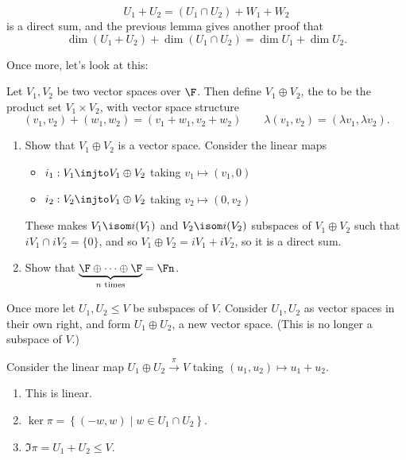 \begin{corollary}
	\begin{equation*}
		U_1 + U_2 = (U_1 \cap U_2) + W_1 + W_2
	\end{equation*}
	is a direct sum, and the previous lemma gives another proof that
	\begin{equation*}
		\dim(U_1 + U_2) + \dim(U_1 \cap U_2) = \dim U_1 + \dim U_2.
	\end{equation*}
\end{corollary}

Once more, let's look at this:

\begin{definition}
	Let $V_1,V_2$ be two vector spaces over $\F$. Then define $V_1\oplus V_2$, the  to be the product set $V_1\times V_2$, with vector space structure %
	\begin{equation*}
		(v_1,v_2) + (w_1,w_2) = (v_1+w_1,v_2+w_2)
		\qquad
		\lambda\left( v_1,v_2 \right) = \left( \lambda v_1 , \lambda v_2 \right).
	\end{equation*}
\end{definition}

\begin{exercises}
	\mbox{} %
	\begin{enumerate}
		\item Show that $V_1\oplus V_2$ is a vector space. Consider the linear maps
		\begin{itemize}
			\shortskip
			\item [] $i_1:V_1 \injto V_1\oplus V_2$ taking $v_1\mapsto(v_1,0)$
			\item [] $i_2:V_2 \injto V_1\oplus V_2$ taking $v_2\mapsto(0,v_2)$
		\end{itemize}
		These makes $V_1\isom i(V_1)$ and $V_2 \isom i(V_2)$ subspaces of $V_1\oplus V_2$ such that $iV_1 \cap iV_2 = \{0\}$, and so $V_1\oplus V_2 = iV_1 + iV_2$, so it is a direct sum.%
		
		\item Show that $\underbrace{\F \oplus \cdots \oplus \F}_{n \text{ times}} = \Fn$. %
	\end{enumerate}
\end{exercises}

Once more let $U_1,U_2\leq V$ be subspaces of $V$. Consider $U_1,U_2$ as vector spaces in their own right, and form $U_1\oplus U_2$, a new vector space. (This is no longer a subspace of $V$.)

\begin{lemma}
	Consider the linear map $U_1\oplus U_2 \xrightarrow{\pi} V$ taking $(u_1,u_2) \mapsto u_1+u_2$. %
	\begin{enumerate}
		\shortskip
		\item This is linear.
		\item $\ker\pi = \left\{(-w,w)\mid w\in U_1\cap U_2\right\}$.
		\item $\Im\pi = U_1+U_2\leq V$.
	\end{enumerate}
\end{lemma}

